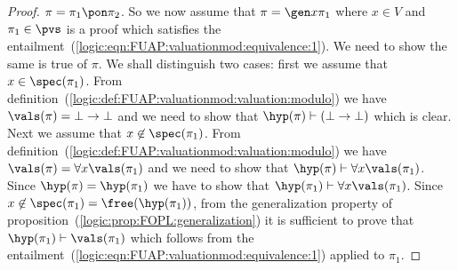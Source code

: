 \begin{proof}
$\pi=\pi_{1}\pon\pi_{2}$. So we now assume that $\pi=\gen x\pi_{1}$
where $x\in V$ and $\pi_{1}\in\pvs$ is a proof which satisfies the
entailment~(\ref{logic:eqn:FUAP:valuationmod:equivalence:1}). We
need to show the same is true of $\pi$. We shall distinguish two
cases: first we assume that $x\in\spec(\pi_{1})$. From
definition~(\ref{logic:def:FUAP:valuationmod:valuation:modulo}) we
have $\vals(\pi)=\bot\to\bot$ and we need to show that
$\hyp(\pi)\vdash(\bot\to\bot)$ which is clear. Next we assume that
$x\not\in\spec(\pi_{1})$. From
definition~(\ref{logic:def:FUAP:valuationmod:valuation:modulo}) we
have $\vals(\pi)=\forall x\vals(\pi_{1})$ and we need to show that
$\hyp(\pi)\vdash\forall x\vals(\pi_{1})$. Since
$\hyp(\pi)=\hyp(\pi_{1})$ we have to show that
$\hyp(\pi_{1})\vdash\forall x\vals(\pi_{1})$. Since
$x\not\in\spec(\pi_{1})=\free(\hyp(\pi_{1}))$, from the
generalization property of
proposition~(\ref{logic:prop:FOPL:generalization}) it is sufficient
to prove that $\hyp(\pi_{1})\vdash\vals(\pi_{1})$ which follows from
the entailment~(\ref{logic:eqn:FUAP:valuationmod:equivalence:1})
applied to $\pi_{1}$.
\end{proof}


